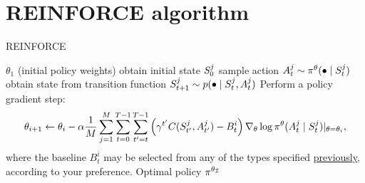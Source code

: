 \documentclass[12pt,twoside]{../../mitthesis}
\begin{document}
\section*{REINFORCE algorithm}
\begin{algorithm}
    \caption{REINFORCE}
    \label{alg:my-alg}
    \begin{algorithmic}
     $\theta_1$ (initial policy weights)
            \STATE obtain initial state $S_0^{j}$
                \STATE sample action $A_t^j \sim \pi^{\theta}(\bullet \mid S_t^{j})$
                \STATE obtain state from transition function $S_{t+1}^j \sim p(\bullet \mid S_t^j, A_t^j)$
            \ENDFOR
        \ENDFOR
        \STATE  Perform a policy gradient step:
        \begin{equation}
        \label{eqn_reinforce_update_rule}
            \theta_{i+1} \leftarrow \theta_i - \alpha \frac{1}{M}\sum_{j = 1}^M \sum_{t = 0}^{T-1}\sum_{t'=t}^{T-1}\left( \gamma^{t'} C(S_{t'}^j, A_{t'}^j) - B_{t}^i\right) \nabla_{\theta}\log \pi^{\theta}(A_t^j \mid S_t^j)\rvert_{\theta = \theta_i},
        \end{equation}
        \STATE where the baseline $B_t^i$ may be selected from any of the types specified \hyperlink{baseline-and-do-not-let-the-past-distract-you- principle}{previously}, according to your preference.
    \ENDFOR
    \STATE \RETURN Optimal policy $\pi^{\theta_{\mathcal I}}$
    \end{algorithmic}
\end{algorithm}
\end{document}
